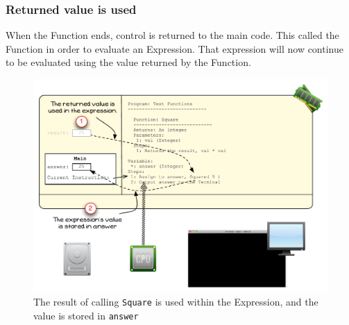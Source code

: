 


\clearpage

\subsubsection{Returned value is used} %
\label{ssub:returned_value_is_used}

When the Function ends, control is returned to the main code. This called the Function in order to evaluate an Expression. That expression will now continue to be evaluated using the value returned by the Function.

\begin{figure}[htbp]
   \centering
   \includegraphics[width=\textwidth]{./topics/storing-using-data/images/vis-func-4} 
   \caption{The result of calling \texttt{Square} is used within the Expression, and the value is stored in \texttt{answer}}
   \label{fig:vis-func-4}
\end{figure}

